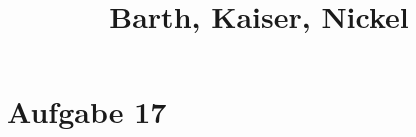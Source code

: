 

\subject{Blatt 5}
\title{Barth, Kaiser, Nickel}



\maketitle
\thispagestyle{empty}


\section{Aufgabe 17}




